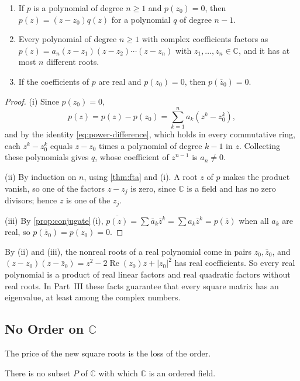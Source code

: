 \begin{corollary}
\label{cor:factor}
\leavevmode
\begin{enumerate}
\item If $p$ is a polynomial of degree $n\ge1$ and $p(z_0)=0$, then $p(z)=(z-z_0)q(z)$ for a polynomial $q$ of degree $n-1$.
\item Every polynomial of degree $n\ge1$ with complex coefficients factors as $p(z)=a_n(z-z_1)(z-z_2)\cdots(z-z_n)$ with $z_1,\ldots,z_n\in\mathbb C$, and it has at most $n$ different roots.
\item If the coefficients of $p$ are real and $p(z_0)=0$, then $p(\bar z_0)=0$.
\end{enumerate}
\end{corollary}

\begin{proof}
(i) Since $p(z_0)=0$,
\[
p(z)=p(z)-p(z_0)=\sum_{k=1}^na_k(z^k-z_0^k),
\]
and by the identity \eqref{eq:power-difference}, which holds in every commutative ring, each $z^k-z_0^k$ equals $z-z_0$ times a polynomial of degree $k-1$ in $z$. Collecting these polynomials gives $q$, whose coefficient of $z^{n-1}$ is $a_n\ne0$.

(ii) By induction on $n$, using \cref{thm:fta} and (i). A root $z$ of $p$ makes the product vanish, so one of the factors $z-z_j$ is zero, since $\mathbb C$ is a field and has no zero divisors; hence $z$ is one of the $z_j$.

(iii) By \cref{prop:conjugate}\,(i), $\overline{p(z)}=\sum\bar a_k\bar z^k=\sum a_k\bar z^k=p(\bar z)$ when all $a_k$ are real, so $p(\bar z_0)=\overline{p(z_0)}=0$.
\end{proof}

By (ii) and (iii), the nonreal roots of a real polynomial come in pairs $z_0,\bar z_0$, and $(z-z_0)(z-\bar z_0)=z^2-2\operatorname{Re}(z_0)z+|z_0|^2$ has real coefficients. So every real polynomial is a product of real linear factors and real quadratic factors without real roots. In Part~III these facts guarantee that every square matrix has an eigenvalue, at least among the complex numbers.

\subsection{No Order on $\mathbb C$}

The price of the new square roots is the loss of the order.

\begin{proposition}
\label{prop:c-not-ordered}
There is no subset $P$ of $\mathbb C$ with which $\mathbb C$ is an ordered field.
\end{proposition}

